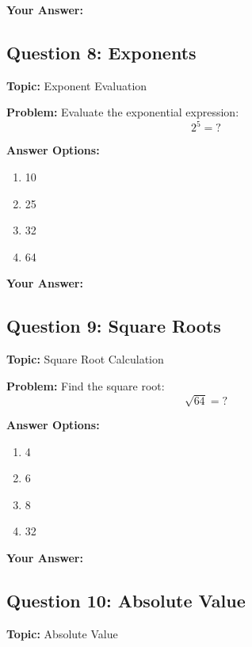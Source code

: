 \documentclass[12pt]{article}
\begin{document}
\noindent\textbf{Your Answer:} \underline{\hspace{2cm}}

\vspace{0.5cm}


\subsection{Question 8: Exponents}
\textbf{Topic:} Exponent Evaluation

\textbf{Problem:} Evaluate the exponential expression:
\[2^5 = ?\]

\textbf{Answer Options:}
\begin{enumerate}[label=\Alph*)]
    \item 10
    \item 25
    \item 32
    \item 64
\end{enumerate}

\noindent\textbf{Your Answer:} \underline{\hspace{2cm}}

\vspace{0.5cm}


\subsection{Question 9: Square Roots}
\textbf{Topic:} Square Root Calculation

\textbf{Problem:} Find the square root:
\[\sqrt{64} = ?\]

\textbf{Answer Options:}
\begin{enumerate}[label=\Alph*)]
    \item 4
    \item 6
    \item 8
    \item 32
\end{enumerate}

\noindent\textbf{Your Answer:} \underline{\hspace{2cm}}

\vspace{0.5cm}


\subsection{Question 10: Absolute Value}
\textbf{Topic:} Absolute Value
\end{document}
